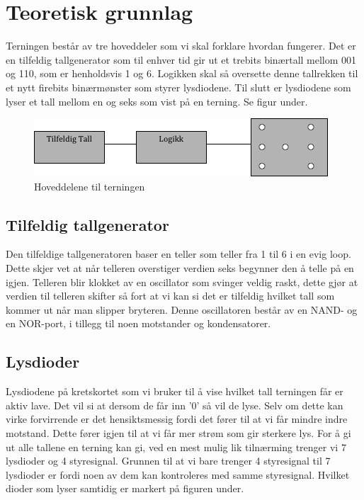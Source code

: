 \documentclass[12pt,norsk,a4paper]{article}
\begin{document}
\clearpage

\section{Teoretisk grunnlag}
Terningen består av tre hoveddeler som vi skal forklare hvordan fungerer. Det er en tilfeldig tallgenerator som til enhver tid
gir ut et trebits binærtall mellom 001 og 110, som er henholdsvis 1 og 6. Logikken skal så oversette denne tallrekken til et nytt firebits binærmønster som styrer lysdiodene. Til slutt er lysdiodene som lyser et tall mellom en og seks som vist på en terning. Se figur under.

\begin{figure}[H]
\includegraphics{Blokkskjema.png}
\caption{Hoveddelene til terningen}
\label{fig:blokkskjema}
\end{figure}

    \subsection{Tilfeldig tallgenerator}
    Den tilfeldige tallgeneratoren baser en teller som teller fra 1 til 6 i en evig loop. Dette skjer vet at når telleren overstiger verdien seks begynner den å telle på en igjen. Telleren blir klokket av en oscillator som svinger
    veldig raskt, dette gjør at verdien til telleren skifter så fort at vi kan si det er tilfeldig hvilket tall som kommer ut når man slipper bryteren. Denne oscillatoren består av en NAND- og en NOR-port, i tillegg til noen motstander og kondensatorer.

    
    \subsection{Lysdioder}
    Lysdiodene på kretskortet som vi bruker til å vise hvilket tall terningen får er aktiv lave. Det vil si at dersom de får inn '0'
    så vil de lyse. Selv om dette kan virke forvirrende er det hensiktsmessig fordi det fører til at vi får mindre indre motstand. Dette fører igjen til at vi får mer strøm som gir sterkere lys. For å gi ut alle tallene en terning kan gi, ved en mest mulig lik tilnærming trenger vi 7 lysdioder og 4 styresignal. Grunnen til at vi bare trenger 4 styresignal til 7 lysdioder er fordi noen av dem kan kontroleres med samme styresignal. Hvilket dioder som lyser samtidig er markert på figuren under.
\end{document}
